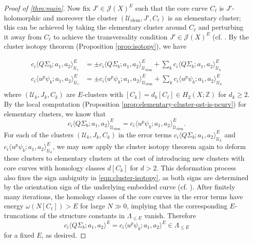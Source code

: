 \documentclass[reqno]{amsart}
\numberwithin{equation}{section}
\numberwithin{equation}{section}
\numberwithin{equation}{section}
\theoremstyle{definition}
\theoremstyle{remark}
\theoremstyle{remark}
\begin{document}
\begin{proof}[Proof of \cref{thm:main}]
    Now fix $J' \in \mathcal{J}(X)^E$ such that the core curve $C_\ell$ is $J'$-holomorphic and moreover the cluster $(\mathcal{U}_{\mathrm{elem}}, J', C_\ell)$ is an elementary cluster; this can be achieved by taking the elementary cluster around $C_\ell$ and perturbing it away from $C_\ell$ to achieve the transversality condition $J' \in \mathcal{J}(X)^E$ (cf. \cite[Theorem 7.1]{IP-GV}. By the cluster isotopy theorem (Proposition \ref{prop:isotopy}), we have 

    \begin{equation}\label{eqn:cluster-isotopy}
    \begin{aligned}
    c_i \langle Q\Sigma_b ; a_1, a_2 \rangle^E_{\mathcal{U}_\ell}  &= \pm c_i \langle Q\Sigma_b ; a_1, a_2 \rangle^E_{\mathcal{U}_{\mathrm{elem}}} + \sum_k c_i \langle Q\Sigma_b ; a_1, a_2 \rangle^E_{\mathcal{U}_k}
    \\
    c_i \langle u^p \psi_b; a_1, a_2 \rangle^E_{\mathcal{U}_\ell}  &= \pm c_i \langle u^p \psi_b; a_1, a_2 \rangle^E_{\mathcal{U}_{\mathrm{elem}}} + \sum_k c_i \langle u^p \psi_b; a_1, a_2 \rangle^E_{\mathcal{U}_k}\\
    \end{aligned}
    \end{equation}
    where $(\mathcal{U}_k, J_k, C_k)$ are $E$-clusters with $[C_k] = d_k [C_\ell] \in H_2(X;\mathbb{Z})$ for $d_k \ge 2$. By the local computation (Proposition \ref{prop:elementary-cluster-qst-is-pcurv}) for elementary clusters, we know that 
    \begin{equation}
        c_i \langle Q\Sigma_b ; a_1, a_2 \rangle^E_{\mathcal{U}_{\mathrm{elem}}} = c_i \langle u^p \psi_b ; a_1, a_2 \rangle^E_{\mathcal{U}_{\mathrm{elem}}}.
    \end{equation}
    For each of the clusters $(\mathcal{U}_k, J_k, C_k)$ in the error terms $c_i \langle Q\Sigma_b ; a_1, a_2 \rangle^E_{\mathcal{U}_k}$ and $c_i \langle u^p \psi_b ; a_1, a_2 \rangle^E_{\mathcal{U}_{k}}$, we may now apply the cluster isotopy theorem again to deform these clusters to elementary clusters at the cost of introducing new clusters with core curves with homology classes $d[C_k]$ for $d>2$. This deformation process also fixes the sign ambiguity in \eqref{eqn:cluster-isotopy}, as both signs are determined by the orientation sign of the underlying embedded curve (cf. \cite[Equation (7.3)]{IP-GV}). After finitely many iterations, the homology classes of the core curves in the error terms have energy $\omega(N[C_\ell]) > E$ for large $N \gg 0$, implying that the corresponding $E$-truncations of the structure constants in $\Lambda_{\le E}$ vanish. Therefore
        \begin{equation}
        c_i \langle Q\Sigma_b ; a_1, a_2 \rangle^E =     c_i \langle u^p \psi_b ; a_1, a_2 \rangle^E \in \Lambda_{\le E}
    \end{equation}
    for a fixed $E$, as desired.
\end{proof}
\end{document}
